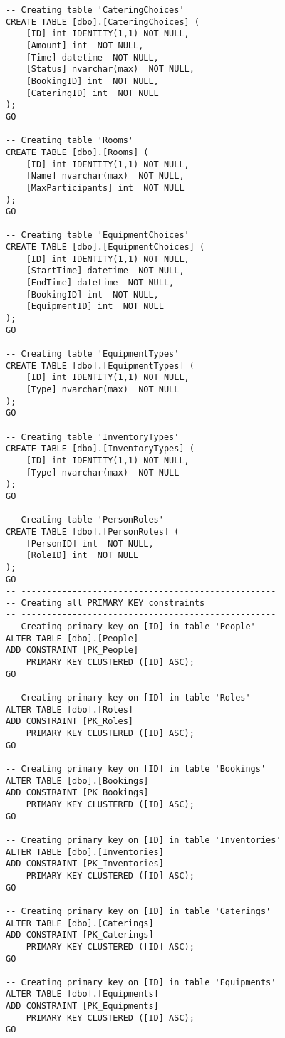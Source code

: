 \begin{lstlisting}[label=SQL, caption= SQL-kode til oprettelse af database]
-- Creating table 'CateringChoices'
CREATE TABLE [dbo].[CateringChoices] (
    [ID] int IDENTITY(1,1) NOT NULL,
    [Amount] int  NOT NULL,
    [Time] datetime  NOT NULL,
    [Status] nvarchar(max)  NOT NULL,
    [BookingID] int  NOT NULL,
    [CateringID] int  NOT NULL
);
GO

-- Creating table 'Rooms'
CREATE TABLE [dbo].[Rooms] (
    [ID] int IDENTITY(1,1) NOT NULL,
    [Name] nvarchar(max)  NOT NULL,
    [MaxParticipants] int  NOT NULL
);
GO

-- Creating table 'EquipmentChoices'
CREATE TABLE [dbo].[EquipmentChoices] (
    [ID] int IDENTITY(1,1) NOT NULL,
    [StartTime] datetime  NOT NULL,
    [EndTime] datetime  NOT NULL,
    [BookingID] int  NOT NULL,
    [EquipmentID] int  NOT NULL
);
GO

-- Creating table 'EquipmentTypes'
CREATE TABLE [dbo].[EquipmentTypes] (
    [ID] int IDENTITY(1,1) NOT NULL,
    [Type] nvarchar(max)  NOT NULL
);
GO

-- Creating table 'InventoryTypes'
CREATE TABLE [dbo].[InventoryTypes] (
    [ID] int IDENTITY(1,1) NOT NULL,
    [Type] nvarchar(max)  NOT NULL
);
GO

-- Creating table 'PersonRoles'
CREATE TABLE [dbo].[PersonRoles] (
    [PersonID] int  NOT NULL,
    [RoleID] int  NOT NULL
);
GO
-- --------------------------------------------------
-- Creating all PRIMARY KEY constraints
-- --------------------------------------------------
-- Creating primary key on [ID] in table 'People'
ALTER TABLE [dbo].[People]
ADD CONSTRAINT [PK_People]
    PRIMARY KEY CLUSTERED ([ID] ASC);
GO

-- Creating primary key on [ID] in table 'Roles'
ALTER TABLE [dbo].[Roles]
ADD CONSTRAINT [PK_Roles]
    PRIMARY KEY CLUSTERED ([ID] ASC);
GO

-- Creating primary key on [ID] in table 'Bookings'
ALTER TABLE [dbo].[Bookings]
ADD CONSTRAINT [PK_Bookings]
    PRIMARY KEY CLUSTERED ([ID] ASC);
GO

-- Creating primary key on [ID] in table 'Inventories'
ALTER TABLE [dbo].[Inventories]
ADD CONSTRAINT [PK_Inventories]
    PRIMARY KEY CLUSTERED ([ID] ASC);
GO

-- Creating primary key on [ID] in table 'Caterings'
ALTER TABLE [dbo].[Caterings]
ADD CONSTRAINT [PK_Caterings]
    PRIMARY KEY CLUSTERED ([ID] ASC);
GO

-- Creating primary key on [ID] in table 'Equipments'
ALTER TABLE [dbo].[Equipments]
ADD CONSTRAINT [PK_Equipments]
    PRIMARY KEY CLUSTERED ([ID] ASC);
GO


\end{lstlisting}
